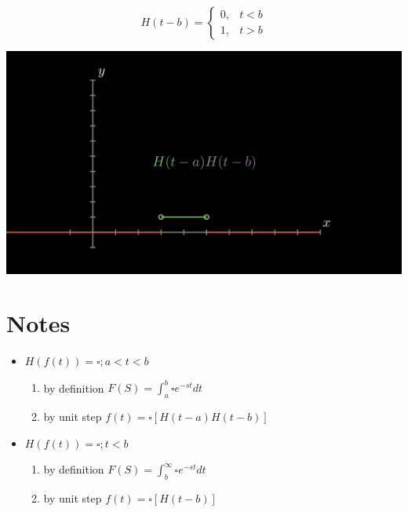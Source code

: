 \documentclass[11pt]{article}
\theoremstyle{definition}
\begin{document}
\[   
    H(t- b) = 
     \begin{cases}
    0, & \text{$t < b$} \\ 
    1, & \text{$t > b$}
     \end{cases}
\]

\begin{center}
\includegraphics[scale=0.15]{Test3.png}
\end{center}

\section{Notes}
\begin{itemize}
    \item $H(f(t)) = \square; a< t < b$ 
        \begin{enumerate}
            \item by definition $F(S) = \int_a^b\square e^{-st} dt$
            \item by unit step $f(t) = \square[H(t-a)H(t-b)]$   
        \end{enumerate}

    \item $H(f(t)) = \square; t < b$ 
        \begin{enumerate}
            \item by definition $F(S) = \int_b^\infty \square e^{-st} dt$
            \item by unit step $f(t) = \square[H(t-b)]$   
        \end{enumerate}

\end{itemize}
\end{document}
